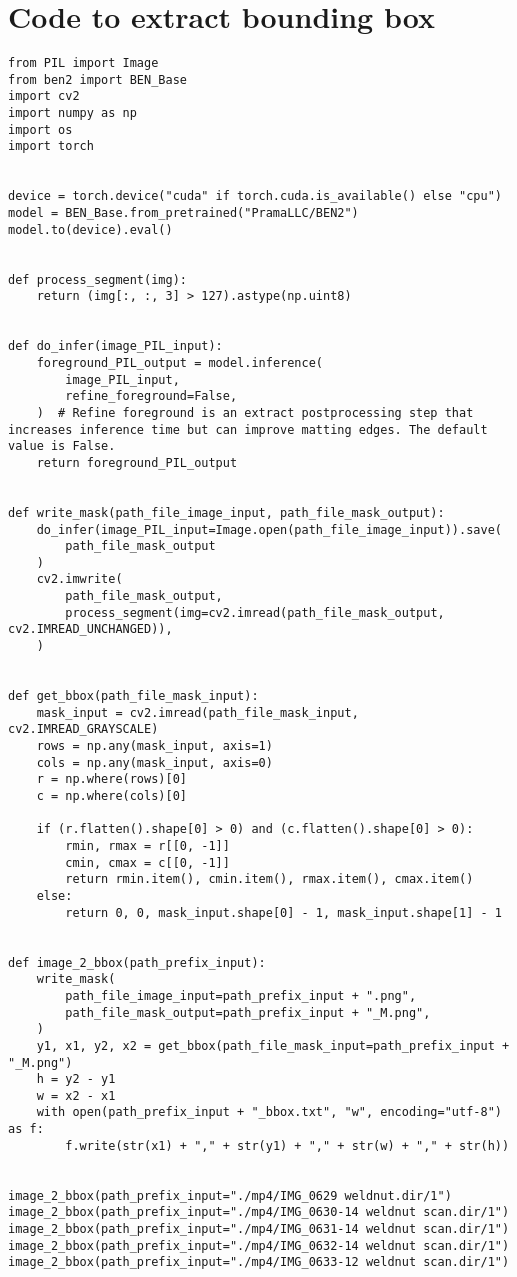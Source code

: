 \documentclass[11pt]{article}
\begin{document}
\section{Code to extract bounding box}
\label{sec:org95902d8}
\begin{verbatim}
from PIL import Image
from ben2 import BEN_Base
import cv2
import numpy as np
import os
import torch


device = torch.device("cuda" if torch.cuda.is_available() else "cpu")
model = BEN_Base.from_pretrained("PramaLLC/BEN2")
model.to(device).eval()


def process_segment(img):
    return (img[:, :, 3] > 127).astype(np.uint8)


def do_infer(image_PIL_input):
    foreground_PIL_output = model.inference(
        image_PIL_input,
        refine_foreground=False,
    )  # Refine foreground is an extract postprocessing step that increases inference time but can improve matting edges. The default value is False.
    return foreground_PIL_output


def write_mask(path_file_image_input, path_file_mask_output):
    do_infer(image_PIL_input=Image.open(path_file_image_input)).save(
        path_file_mask_output
    )
    cv2.imwrite(
        path_file_mask_output,
        process_segment(img=cv2.imread(path_file_mask_output, cv2.IMREAD_UNCHANGED)),
    )


def get_bbox(path_file_mask_input):
    mask_input = cv2.imread(path_file_mask_input, cv2.IMREAD_GRAYSCALE)
    rows = np.any(mask_input, axis=1)
    cols = np.any(mask_input, axis=0)
    r = np.where(rows)[0]
    c = np.where(cols)[0]

    if (r.flatten().shape[0] > 0) and (c.flatten().shape[0] > 0):
        rmin, rmax = r[[0, -1]]
        cmin, cmax = c[[0, -1]]
        return rmin.item(), cmin.item(), rmax.item(), cmax.item()
    else:
        return 0, 0, mask_input.shape[0] - 1, mask_input.shape[1] - 1


def image_2_bbox(path_prefix_input):
    write_mask(
        path_file_image_input=path_prefix_input + ".png",
        path_file_mask_output=path_prefix_input + "_M.png",
    )
    y1, x1, y2, x2 = get_bbox(path_file_mask_input=path_prefix_input + "_M.png")
    h = y2 - y1
    w = x2 - x1
    with open(path_prefix_input + "_bbox.txt", "w", encoding="utf-8") as f:
        f.write(str(x1) + "," + str(y1) + "," + str(w) + "," + str(h))


image_2_bbox(path_prefix_input="./mp4/IMG_0629 weldnut.dir/1")
image_2_bbox(path_prefix_input="./mp4/IMG_0630-14 weldnut scan.dir/1")
image_2_bbox(path_prefix_input="./mp4/IMG_0631-14 weldnut scan.dir/1")
image_2_bbox(path_prefix_input="./mp4/IMG_0632-14 weldnut scan.dir/1")
image_2_bbox(path_prefix_input="./mp4/IMG_0633-12 weldnut scan.dir/1")
\end{verbatim}
\end{document}

